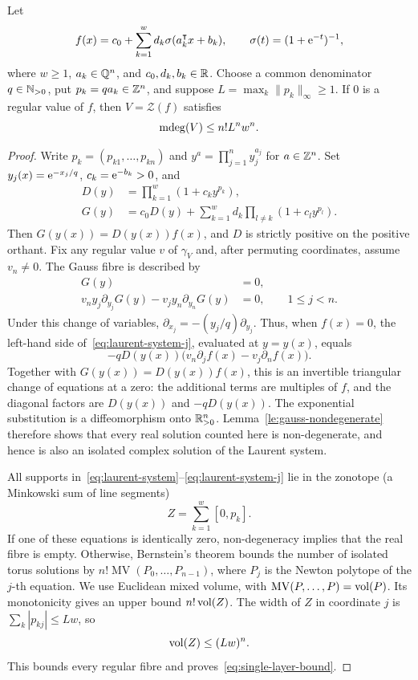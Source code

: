 \begin{proposition}\label{prop:single-layer-degree}
Let
\[
f(x)=c_0+\sum_{k=1}^w d_k\sigma(a_k^{\intercal}x+b_k),
\qquad \sigma(t)=(1+\mathrm{e}^{-t})^{-1},
\]
where $w\ge1$, $a_k\in\mathbb{Q}^n$, and $c_0,d_k,b_k\in\mathbb{R}$. Choose a common denominator $q\in\mathbb{N}_{>0}$, put $p_k=qa_k\in\mathbb{Z}^n$, and suppose $L=\max_k\|p_k\|_\infty\ge1$. If $0$ is a regular value of $f$, then $V=\mathcal Z(f)$ satisfies
\begin{equation}\label{eq:single-layer-bound}
\operatorname{\mathrm{mdeg}}(V)\le n!L^nw^n.
\end{equation}
\end{proposition}

\begin{proof}
Write $p_k=(p_{k1},\dots,p_{kn})$ and $y^a=\prod_{j=1}^n y_j^{a_j}$ for $a\in\mathbb{Z}^n$. Set $y_j(x)=\mathrm{e}^{-x_j/q}$, $c_k=\mathrm{e}^{-b_k}>0$, and
\begin{align}
D(y)&=\prod_{k=1}^w(1+c_ky^{p_k}),\nonumber\\
G(y)&=c_0D(y)+\sum_{k=1}^w d_k\prod_{l\ne k}(1+c_ly^{p_l}).
\label{eq:laurent-numerator}
\end{align}
Then $G(y(x))=D(y(x))f(x)$, and $D$ is strictly positive on the positive orthant. Fix any regular value $v$ of $\gamma_V$ and, after permuting coordinates, assume $v_n\ne0$. The Gauss fibre is described by
\begin{align}
G(y)&=0,\label{eq:laurent-system}\\
v_ny_j\partial_{y_j}G(y)-v_jy_n\partial_{y_n}G(y)&=0,
\qquad 1\le j<n.\label{eq:laurent-system-j}
\end{align}
Under this change of variables, $\partial_{x_j}=-(y_j/q)\partial_{y_j}$. Thus, when $f(x)=0$, the left-hand side of~\eqref{eq:laurent-system-j}, evaluated at $y=y(x)$, equals
\[
-qD(y(x))\bigl(v_n\partial_j f(x)-v_j\partial_n f(x)\bigr).
\]
Together with $G(y(x))=D(y(x))f(x)$, this is an invertible triangular change of equations at a zero: the additional terms are multiples of $f$, and the diagonal factors are $D(y(x))$ and $-qD(y(x))$. The exponential substitution is a diffeomorphism onto $\mathbb{R}_{>0}^n$. Lemma~\ref{le:gauss-nondegenerate} therefore shows that every real solution counted here is non-degenerate, and hence is also an isolated complex solution of the Laurent system.

All supports in~\eqref{eq:laurent-system}--\eqref{eq:laurent-system-j} lie in the zonotope (a Minkowski sum of line segments)
\[
Z=\sum_{k=1}^w[0,p_k].
\]
If one of these equations is identically zero, non-degeneracy implies that the real fibre is empty. Otherwise, Bernstein's theorem bounds the number of isolated torus solutions by
$n!\operatorname{MV}(P_0,\dots,P_{n-1})$, where $P_j$ is the Newton polytope of the $j$-th equation. We use Euclidean mixed volume, with $\operatorname{MV}(P,\dots,P)=\operatorname{vol}(P)$. Its monotonicity gives an upper bound $n!\operatorname{vol}(Z)$. The width of $Z$ in coordinate $j$ is $\sum_k|p_{kj}|\le Lw$, so
\begin{equation}\label{eq:zonotope-volume}
\operatorname{vol}(Z)\le(Lw)^n.
\end{equation}
This bounds every regular fibre and proves~\eqref{eq:single-layer-bound}.
\end{proof}

